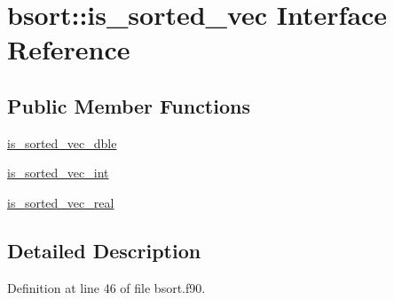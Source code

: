 \hypertarget{interfacebsort_1_1is__sorted__vec}{\section{bsort\-:\-:is\-\_\-sorted\-\_\-vec Interface Reference}
\label{interfacebsort_1_1is__sorted__vec}
}
\subsection*{Public Member Functions}
\begin{DoxyCompactItemize}
\item 
\hyperlink{interfacebsort_1_1is__sorted__vec_a328d3a1b75adc2dabf4bb457091d5655_a328d3a1b75adc2dabf4bb457091d5655}{is\-\_\-sorted\-\_\-vec\-\_\-dble}
\item 
\hyperlink{interfacebsort_1_1is__sorted__vec_a3fd933b3b5dfe8e27080f0df279ef311_a3fd933b3b5dfe8e27080f0df279ef311}{is\-\_\-sorted\-\_\-vec\-\_\-int}
\item 
\hyperlink{interfacebsort_1_1is__sorted__vec_a168e387e6c49335cad160ba9003766d9_a168e387e6c49335cad160ba9003766d9}{is\-\_\-sorted\-\_\-vec\-\_\-real}
\end{DoxyCompactItemize}


\subsection{Detailed Description}


Definition at line 46 of file bsort.\-f90.



